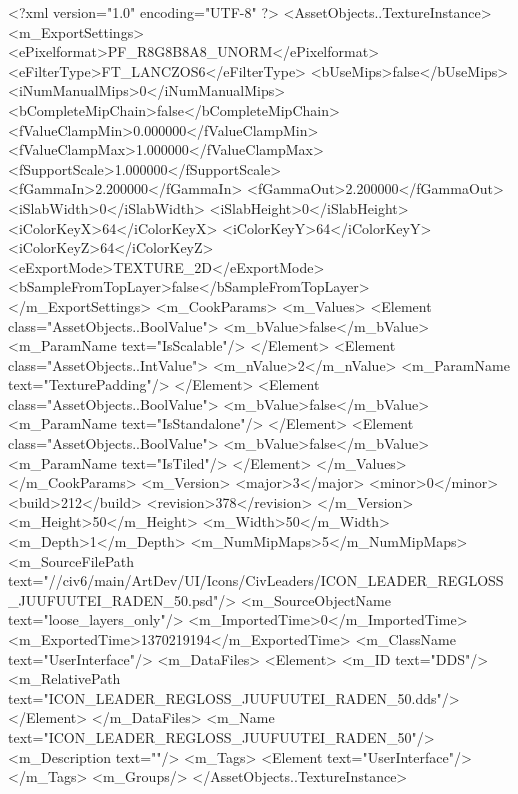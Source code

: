 <?xml version="1.0" encoding="UTF-8" ?>
<AssetObjects..TextureInstance>
	<m_ExportSettings>
		<ePixelformat>PF_R8G8B8A8_UNORM</ePixelformat>
		<eFilterType>FT_LANCZOS6</eFilterType>
		<bUseMips>false</bUseMips>
		<iNumManualMips>0</iNumManualMips>
		<bCompleteMipChain>false</bCompleteMipChain>
		<fValueClampMin>0.000000</fValueClampMin>
		<fValueClampMax>1.000000</fValueClampMax>
		<fSupportScale>1.000000</fSupportScale>
		<fGammaIn>2.200000</fGammaIn>
		<fGammaOut>2.200000</fGammaOut>
		<iSlabWidth>0</iSlabWidth>
		<iSlabHeight>0</iSlabHeight>
		<iColorKeyX>64</iColorKeyX>
		<iColorKeyY>64</iColorKeyY>
		<iColorKeyZ>64</iColorKeyZ>
		<eExportMode>TEXTURE_2D</eExportMode>
		<bSampleFromTopLayer>false</bSampleFromTopLayer>
	</m_ExportSettings>
	<m_CookParams>
		<m_Values>
			<Element class="AssetObjects..BoolValue">
				<m_bValue>false</m_bValue>
				<m_ParamName text="IsScalable"/>
			</Element>
			<Element class="AssetObjects..IntValue">
				<m_nValue>2</m_nValue>
				<m_ParamName text="TexturePadding"/>
			</Element>
			<Element class="AssetObjects..BoolValue">
				<m_bValue>false</m_bValue>
				<m_ParamName text="IsStandalone"/>
			</Element>
			<Element class="AssetObjects..BoolValue">
				<m_bValue>false</m_bValue>
				<m_ParamName text="IsTiled"/>
			</Element>
		</m_Values>
	</m_CookParams>
	<m_Version>
		<major>3</major>
		<minor>0</minor>
		<build>212</build>
		<revision>378</revision>
	</m_Version>
	<m_Height>50</m_Height>
	<m_Width>50</m_Width>
	<m_Depth>1</m_Depth>
	<m_NumMipMaps>5</m_NumMipMaps>
	<m_SourceFilePath text="//civ6/main/ArtDev/UI/Icons/CivLeaders/ICON_LEADER_REGLOSS_JUUFUUTEI_RADEN_50.psd"/>
	<m_SourceObjectName text="loose_layers_only"/>
	<m_ImportedTime>0</m_ImportedTime>
	<m_ExportedTime>1370219194</m_ExportedTime>
	<m_ClassName text="UserInterface"/>
	<m_DataFiles>
		<Element>
			<m_ID text="DDS"/>
			<m_RelativePath text="ICON_LEADER_REGLOSS_JUUFUUTEI_RADEN_50.dds"/>
		</Element>
	</m_DataFiles>
	<m_Name text="ICON_LEADER_REGLOSS_JUUFUUTEI_RADEN_50"/>
	<m_Description text=""/>
	<m_Tags>
		<Element text="UserInterface"/>
	</m_Tags>
	<m_Groups/>
</AssetObjects..TextureInstance>

